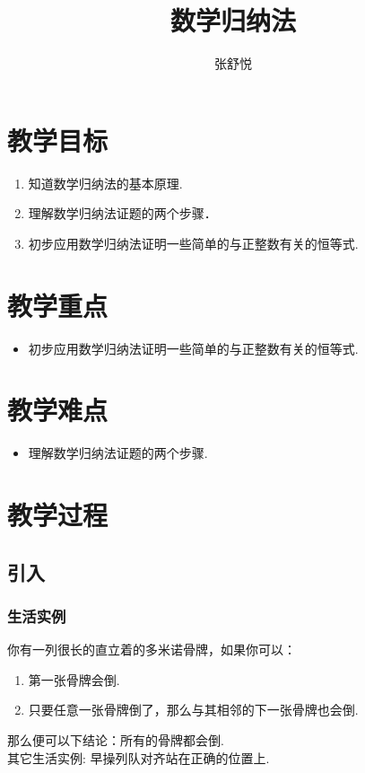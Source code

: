\documentclass{article}
\begin{document}
\begin{CJK}{UTF8}{gkai}

\title{数学归纳法}
\date{}
\author{张舒悦}
\maketitle

\section{教学目标}
\begin{enumerate}
\item 知道数学归纳法的基本原理.
\item 理解数学归纳法证题的两个步骤．
\item 初步应用数学归纳法证明一些简单的与正整数有关的恒等式.
\end{enumerate}

\section{教学重点}
\begin{itemize}
\item 初步应用数学归纳法证明一些简单的与正整数有关的恒等式.
\end{itemize}

\section{教学难点}
\begin{itemize}
\item  理解数学归纳法证题的两个步骤.
\end{itemize}

\section{教学过程}
\subsection{引入}
\subsubsection{生活实例}
你有一列很长的直立着的多米诺骨牌，如果你可以：
\begin{enumerate}[i]
\item 第一张骨牌会倒.
\item 只要任意一张骨牌倒了，那么与其相邻的下一张骨牌也会倒.
\end{enumerate}
那么便可以下结论：所有的骨牌都会倒.
\\[2ex]其它生活实例: 早操列队对齐站在正确的位置上.


\end{CJK}
\end{document}
